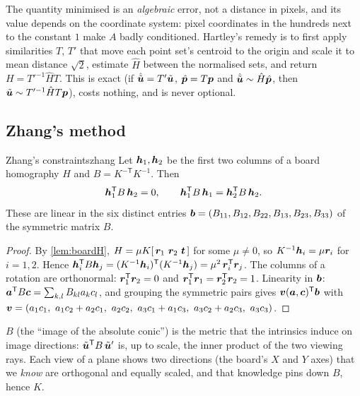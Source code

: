 The quantity minimised is an \emph{algebraic} error, not a distance in
pixels, and its value depends on the coordinate system: pixel
coordinates in the hundreds next to the constant $1$ make $A$ badly
conditioned. Hartley's remedy is to first apply similarities
$T$, $T'$ that move each point set's centroid to the origin and scale it
to mean distance $\sqrt2$, estimate $\hat H$ between the normalised
sets, and return $H=T'^{-1}\hat HT$. This is exact (if $\hat{\tilde
{\bm{u}}}=T'\tilde{\bm{u}}$, $\hat{\bm{p}}=T\bm{p}$ and
$\hat{\tilde{\bm{u}}}\sim\hat H\hat{\bm{p}}$, then $\tilde{\bm{u}}
\sim T'^{-1}\hat HT\bm{p}$), costs nothing, and is never optional.

\subsection{Zhang's method}

\begin{theorem}{Zhang's constraints}{zhang}
Let $\bm{h}_1,\bm{h}_2$ be the first two columns of a board
homography $H$ and $B=K^{-\mathsf T}K^{-1}$. Then
\begin{equation}\label{eq:zhang}
\bm{h}_1^{\mathsf{T}} B\,\bm{h}_2=0,\qquad
\bm{h}_1^{\mathsf{T}} B\,\bm{h}_1=\bm{h}_2^{\mathsf{T}} B\,\bm{h}_2 .
\end{equation}
These are linear in the six distinct entries
$\bm{b}=(B_{11},B_{12},B_{22},B_{13},B_{23},B_{33})$ of the symmetric
matrix $B$.
\end{theorem}

\begin{proof}
By \cref{lem:boardH}, $H=\mu K[\,\vect{r}_1\ \vect{r}_2\ \vect{t}\,]$ for
some $\mu\neq0$, so $K^{-1}\bm{h}_i=\mu\bm{r}_i$ for $i=1,2$. Hence
$\bm{h}_i^{\mathsf{T}} B\bm{h}_j=(K^{-1}\bm{h}_i)^{\mathsf{T}}(K^{-1}\bm{h}_j)=
\mu^2\,\bm{r}_i^{\mathsf{T}}\bm{r}_j$. The columns of a rotation are
orthonormal: $\bm{r}_1^{\mathsf{T}}\bm{r}_2=0$ and
$\bm{r}_1^{\mathsf{T}}\bm{r}_1=\bm{r}_2^{\mathsf{T}}\bm{r}_2=1$. Linearity in
$\bm{b}$: $\bm{a}^{\mathsf{T}} B\bm{c}=\sum_{k,l}B_{kl}a_kc_l$, and grouping
the symmetric pairs gives $\bm{v}(\bm{a},\bm{c})^{\mathsf{T}}\bm{b}$ with
$\vect{v}=(a_1c_1,\ a_1c_2+a_2c_1,\ a_2c_2,\ a_3c_1+a_1c_3,\
a_3c_2+a_2c_3,\ a_3c_3)$.
\end{proof}

\begin{inwords}
$B$ (the ``image of the absolute conic'') is the metric that the
intrinsics induce on image directions: $\tilde{\bm{u}}^{\mathsf{T}} B\,
\tilde{\bm{u}}'$ is, up to scale, the inner product of the two
viewing rays. Each view of a plane shows two directions (the board's
$X$ and $Y$ axes) that we \emph{know} are orthogonal and equally scaled,
and that knowledge pins down $B$, hence $K$.
\end{inwords}

